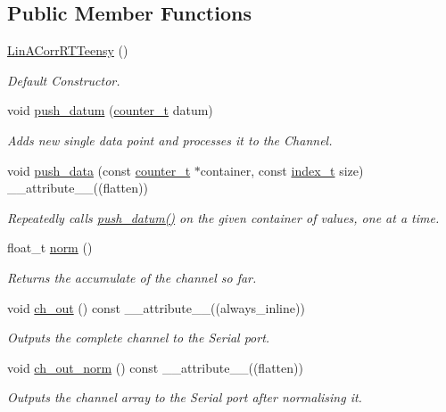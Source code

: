 \subsection*{Public Member Functions}
\begin{DoxyCompactItemize}
\item 
\hyperlink{classLinACorrRTTeensy_aebb83829899235fe5177de735a5367da}{Lin\+A\+Corr\+R\+T\+Teensy} ()
\begin{DoxyCompactList}\small\item\em Default Constructor. \end{DoxyCompactList}\item 
void \hyperlink{classLinACorrRTTeensy_aacc634aad2252efbb6ee3a4c2ac422dc}{push\+\_\+datum} (\hyperlink{types_8hpp_a22f279793847eba127de149437848c48}{counter\+\_\+t} datum)
\begin{DoxyCompactList}\small\item\em Adds new {\itshape single} data point and processes it to the {\ttfamily Channel}. \end{DoxyCompactList}\item 
void \hyperlink{classLinACorrRTTeensy_abf6a40dff92088469fbb8ceabf9da799}{push\+\_\+data} (const \hyperlink{types_8hpp_a22f279793847eba127de149437848c48}{counter\+\_\+t} $\ast$container, const \hyperlink{types_8hpp_ab41b824af8e088d090c0b9e60f536c9d}{index\+\_\+t} size) \+\_\+\+\_\+attribute\+\_\+\+\_\+((flatten))
\begin{DoxyCompactList}\small\item\em Repeatedly calls {\ttfamily \hyperlink{classLinACorrRTTeensy_aacc634aad2252efbb6ee3a4c2ac422dc}{push\+\_\+datum()}} on the given container of values, one at a time. \end{DoxyCompactList}\item 
float\+\_\+t \hyperlink{classLinACorrRTTeensy_a98110e3b97a2300b9078a6e57a8234bc}{norm} ()
\begin{DoxyCompactList}\small\item\em Returns the accumulate of the channel so far. \end{DoxyCompactList}\item 
void \hyperlink{classLinACorrRTTeensy_a967f1b3ea7e6ebdae8c9bf7c2c641e49}{ch\+\_\+out} () const \+\_\+\+\_\+attribute\+\_\+\+\_\+((always\+\_\+inline))
\begin{DoxyCompactList}\small\item\em Outputs the complete channel to the Serial port. \end{DoxyCompactList}\item 
void \hyperlink{classLinACorrRTTeensy_a4d1be65472a058b056386286d093b847}{ch\+\_\+out\+\_\+norm} () const \+\_\+\+\_\+attribute\+\_\+\+\_\+((flatten))
\begin{DoxyCompactList}\small\item\em Outputs the channel array to the Serial port after normalising it. \end{DoxyCompactList}\end{DoxyCompactItemize}
